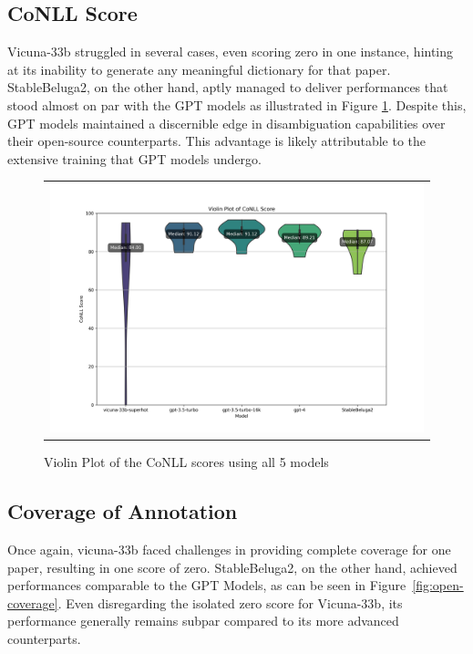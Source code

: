 \subsection{CoNLL Score}

Vicuna-33b struggled in several cases, even scoring zero in one instance, hinting at its inability to generate any meaningful dictionary for that paper. StableBeluga2, on the other hand, aptly managed to deliver performances that stood almost on par with the GPT models as illustrated in Figure \ref{fig:open-source-conll}. Despite this, GPT models maintained a discernible edge in disambiguation capabilities over their open-source counterparts. This advantage is likely attributable to the extensive training that GPT models undergo.

\begin{figure}[htpb]
  \centering
  \begin{tabular}{c}
  \includegraphics[width=14cm]{images/open-conll-score.png}
  \end{tabular}
  \caption[CoNLL Score Open Source]{Violin Plot of the CoNLL scores using all 5 models}\label{fig:open-source-conll}
\end{figure}

\subsection{Coverage of Annotation}

Once again, vicuna-33b faced challenges in providing complete coverage for one paper, resulting in one score of zero. StableBeluga2, on the other hand, achieved performances comparable to the GPT Models, as can be seen in Figure~\ref{fig:open-coverage}. Even disregarding the isolated zero score for Vicuna-33b, its performance generally remains subpar compared to its more advanced counterparts. 

